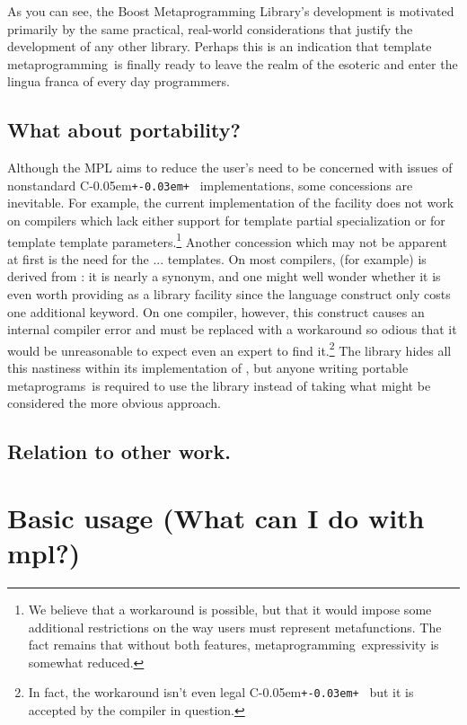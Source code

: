 \documentclass{netobjectdays}
\newcommand{\Cpp}{C\kern-0.05em\texttt{+\kern-0.03em+}%
}
\newcommand{\Mpl}{Boost Meta\-program\-ming Library}
\newcommand{\mping}{meta\-program\-ming}
\newcommand{\mpgms}{meta\-programs}
\begin{document}
As you can see, the \Mpl's development is motivated primarily by the
same practical, real-world considerations that justify the development
of any other library. Perhaps this is an indication that template
\mping\ is finally ready to leave the realm of the esoteric and enter
the lingua franca of every day programmers.

\subsection{What about portability? }

Although the MPL aims to reduce the user's need to be concerned with
issues of nonstandard \Cpp\ implementations, some concessions are
inevitable. For example, the current implementation of the
 facility does not work on compilers which lack either
support for template partial specialization or for template template
parameters.\footnote{We believe that a workaround is possible, but
that it would impose some additional restrictions on the way users
must represent metafunctions. The fact remains that without both
features, \mping\ expressivity is somewhat reduced.} Another
concession which may not be apparent at first is the need for the
... templates. On most compilers,
 (for example) is derived from
: it is nearly a synonym, and one
might well wonder whether it is even worth providing  as a
library facility since the language construct only costs one
additional keyword. On one compiler, however, this construct causes an
internal compiler error and must be replaced with a workaround so
odious that it would be unreasonable to expect even an expert to find
it.\footnote{In fact, the workaround isn't even legal \Cpp\, but it is
accepted by the compiler in question.} The library hides all this
nastiness within its implementation of , but anyone
writing portable \mpgms\ is required to use the library instead of
taking what might be considered the more obvious approach.

\subsection{Relation to other work.}

\section{Basic usage (What can I do with mpl?)}
\end{document}
